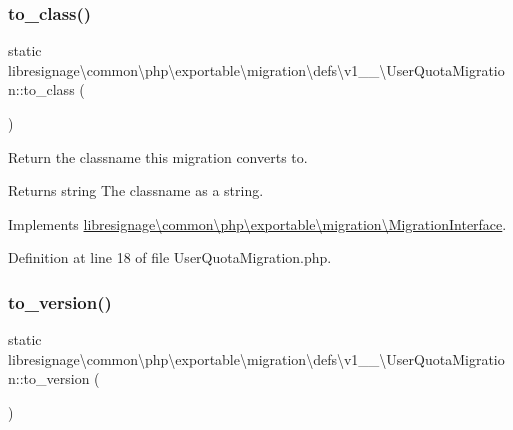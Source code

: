 \subsubsection{\texorpdfstring{to\+\_\+class()}{to\_class()}}
{\footnotesize\ttfamily static libresignage\textbackslash{}common\textbackslash{}php\textbackslash{}exportable\textbackslash{}migration\textbackslash{}defs\textbackslash{}v1\+\_\+\_\textbackslash{}\+User\+Quota\+Migration\+::to\+\_\+class (\begin{DoxyParamCaption}{ }\end{DoxyParamCaption})\hspace{0.3cm}{\ttfamily [static]}}

Return the classname this migration converts to.

\begin{DoxyReturn}{Returns}
string The classname as a string. 
\end{DoxyReturn}


Implements \hyperlink{interfacelibresignage_1_1common_1_1php_1_1exportable_1_1migration_1_1MigrationInterface_ab1f33cdd8684595d6b000bcbc7c4d5a4}{libresignage\textbackslash{}common\textbackslash{}php\textbackslash{}exportable\textbackslash{}migration\textbackslash{}\+Migration\+Interface}.



Definition at line 18 of file User\+Quota\+Migration.\+php.

\mbox{\label{classlibresignage_1_1common_1_1php_1_1exportable_1_1migration_1_1defs_1_1v1__1__0_1_1UserQuotaMigration_aa19eba7b6a2f247409d5c848a21df7b7}} 
\subsubsection{\texorpdfstring{to\+\_\+version()}{to\_version()}}
{\footnotesize\ttfamily static libresignage\textbackslash{}common\textbackslash{}php\textbackslash{}exportable\textbackslash{}migration\textbackslash{}defs\textbackslash{}v1\+\_\+\_\textbackslash{}\+User\+Quota\+Migration\+::to\+\_\+version (\begin{DoxyParamCaption}{ }\end{DoxyParamCaption})\hspace{0.3cm}{\ttfamily [static]}}

